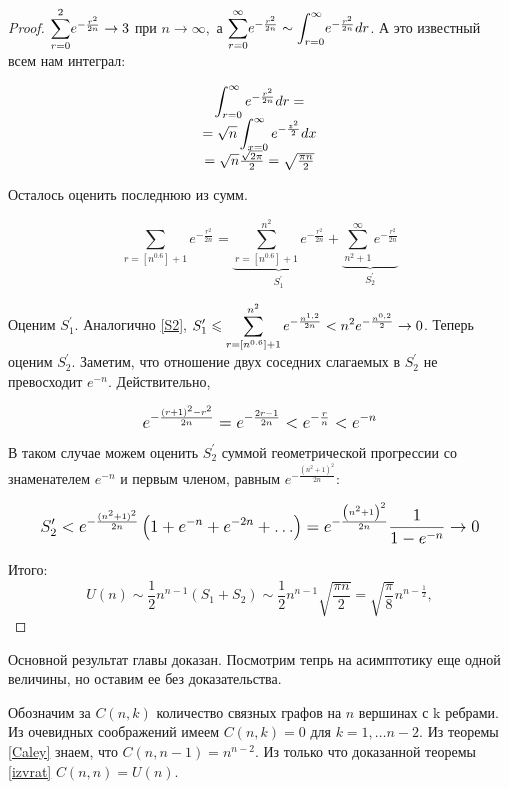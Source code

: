 \begin{proof}
	$\mathlarger \sum_{r=0}^{2} e^{-\frac{r^{2}}{2 n}} \rightarrow 3$ при $n \rightarrow \infty,$ а $\mathlarger \sum_{r=0}^{\infty} e^{-\frac{r^{2}}{2 n}} \sim \mathlarger \int_{r=0}^{\infty} e^{-\frac{r^{2}}{2 n}} dr$. А это известный всем нам интеграл:
	
	$$
	\begin{array}{c}
	\mathlarger{
	\int_{r=0}^{\infty} e^{-\frac{r^{2}}{2 n}} dr} =\\
	=\mathlarger{\sqrt{n} \int_{x=0}^{\infty} e^{-\frac{z^{2}}{2}} dx} \\
	=\sqrt{n} \frac{\sqrt{2\pi}}{2}=\sqrt{\frac{\pi n}{2}} \\
	\end{array} \label{integral}
	$$
	
	Осталось оценить последнюю из сумм.
	
	$$
	\sum_{r=\left[n^{0.6}\right]+1} e^{-\frac{r^{2}}{2 n}}=\underbrace{\sum_{r=\left[n^{0.6}\right]+1}^{n^{2}} e^{-\frac{r^{2}}{2 n}}}_{S_1^{\prime}} + \underbrace{\sum_{n^{2}+1}^{\infty} e^{-\frac{r^{2}}{2 n}}}_{S_{2}^{\prime}}
	$$
	
	Оценим $S_1^{\prime}$. Аналогично  \ref{S2}, $\mathlarger{S_{1}^{\prime} \leqslant \sum_{r=\left[n^{0.6}\right]+1}^{n^{2}} e^{-\frac{n^{1,2}}{2 n}}<n^{2} e^{-\frac{n^{0,2}}{2}} \rightarrow 0}$. Теперь оценим  $S_{2}^{\prime}$. Заметим, что
	отношение двух соседних слагаемых в $S_{2}^{\prime}$ не превосходит $e^{-n}$. Действительно,
	
	$$ \mathlarger{
	e^{-\frac{(r+1)^{2}-r^{2}}{2 n}}=e^{-\frac{2 r-1}{2 n}}<e^{-\frac{r}{n}}<e^{-n}}
	$$
	
	В таком случае можем оценить $S_{2}^{\prime}$ суммой геометрической прогрессии со знаменателем $e^{-n}$ и первым членом, равным  $e^{-\frac{(n^{2}+1)^{2}}{2 n}}$:
	
	$$
	\mathlarger{ S_{2}^{\prime} < e^{-\frac{(n^{2}+1)^{2}}{2 n}}\left(1+e^{-n}+e^{-2 n}+\ldots\right)= e^{ -\frac{\left(n^{2}+1\right)^{2}}{2 n}} \frac{1}{1-e^{-n}} \rightarrow 0}
	$$
	
	Итого:
	$$
	U(n) \sim \frac{1}{2} n^{n-1}\left(S_{1}+S_{2}\right) \sim \frac{1}{2} n^{n-1} \sqrt{\frac{\pi n}{2}}=\sqrt{\frac{\pi}{8}} n^{n-\frac{1}{2}},
	$$
\end{proof}

Основной результат главы доказан. Посмотрим тепрь на асимптотику еще одной величины, но оставим ее без доказательства.

Обозначим за $C(n, k)$ количество связных графов на $n$ вершинах с k ребрами. Из очевидных соображений имеем $C(n, k) = 0$ для $k = 1, \dots n-2$. Из теоремы \ref{Caley} знаем, что $C(n, n-1) = n^{n-2}$. Из только что доказанной теоремы \ref{izvrat} $C(n, n) = U(n)$. 

